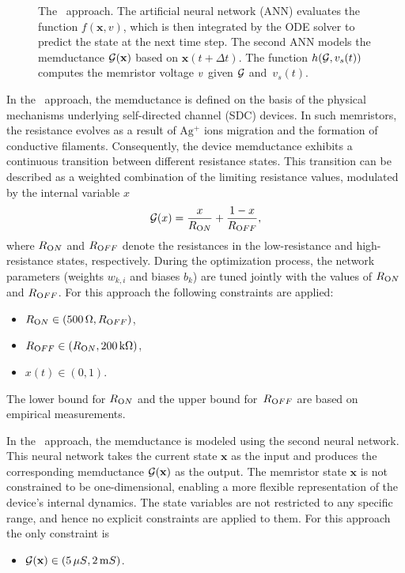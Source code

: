 \documentclass{ieeeaccess}
\begin{document}
\begin{figure}[htbp]
  \centering
  \resizebox{\columnwidth}{!}{%
    
  }
  \caption{The \MemODETwo\ approach. The artificial neural network (ANN) evaluates the function \(f(\mathbf{x},v)\), which is then integrated by the ODE solver to predict the state at the next time step. The second ANN models the  memductance \(\mathcal{G}(\mathbf{x})\) based on \(\mathbf{x}(t\!+\!\Delta t)\). The function \(h(\mathcal{G}, v_s(t))\) computes the memristor voltage \(v\) given \(\mathcal{G}\) and~\(v_s(t)\). 
  }
  \label{fig:nn_structure_dual}
\end{figure}

In the \MemODEOne\ approach, the  memductance is defined on the basis of the physical mechanisms underlying self-directed channel (SDC) devices. In such memristors, the resistance evolves as a result of \(\mathrm{Ag^+}\) ions migration and the formation of conductive filaments. Consequently, the device memductance exhibits a continuous transition between different resistance states. This transition can be described as a weighted combination of the limiting resistance values, modulated by the internal variable \(x\)
\begin{equation}
  \mathcal{G}(x) = \frac{x}{R_{\text ON}} + \frac{1 - x}{R_{\text OFF}},
  \label{eq:conductance}
\end{equation}
where \(R_{\text ON}\) and \(R_{\text OFF}\) denote the resistances in the low-resistance and high-resistance states, respectively. During the optimization process, the network parameters (weights \(w_{k,i}\) and biases \(b_k\)) are tuned jointly with the values of \(R_{\text ON}\) and \(R_{\text OFF}\). For this approach the following constraints are applied:
\begin{itemize}
\item \(R_{\text ON} \in (500\,\Omega, R_{\text OFF})\),
\item \(R_{\text OFF} \in (R_{\text ON}, 200\,{\mathrm k}\Omega)\), 
\item \(x(t) \in (0, 1)\).
\end{itemize}
The lower bound for \(R_{\text ON}\) and the upper bound for~\(R_{\text OFF}\) are based on empirical measurements.


In the \MemODETwo\ approach, the  memductance is modeled using the second neural network. This neural network takes the current state \(\mathbf{x}\) as the input and produces the corresponding memductance \(\mathcal{G}(\mathbf{x})\) as the output. The memristor state \(\mathbf{x}\) is not constrained to be one-dimensional, enabling a more flexible representation of the device’s internal dynamics.
The state variables are not restricted to any specific range, and hence no explicit constraints are applied to them. For this approach the only constraint is
\begin{itemize}
\item \(\mathcal{G}(\mathbf{x}) \in (5\,{\mathrm \mu S}, 2\,{\mathrm mS})\).
\end{itemize}
 
\end{document}
